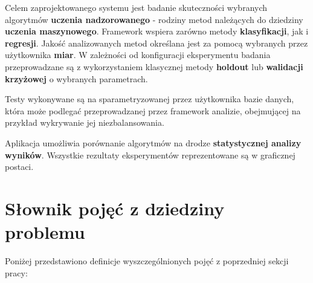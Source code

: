 \documentclass[12pt]{article}
\begin{document}
Celem zaprojektowanego systemu jest badanie skuteczności wybranych algorytmów \textbf{uczenia nadzorowanego} - rodziny metod należących do dziedziny \textbf{uczenia maszynowego}.
Framework wspiera zarówno metody \textbf{klasyfikacji}, jak i \textbf{regresji}. Jakość analizowanych metod określana jest za pomocą wybranych przez użytkownika \textbf{miar}. W zależności od konfiguracji eksperymentu badania przeprowadzane są z wykorzystaniem klasycznej metody \textbf{holdout} lub \textbf{walidacji krzyżowej} o wybranych parametrach.

Testy wykonywane są na sparametryzowanej przez użytkownika bazie danych, która może podlegać przeprowadzanej przez framework analizie, obejmującej na przykład wykrywanie jej niezbalansowania.

Aplikacja umożliwia porównanie algorytmów na drodze \textbf{statystycznej analizy wyników}.
Wszystkie rezultaty eksperymentów reprezentowane są w graficznej postaci.


\section{Słownik pojęć z dziedziny problemu}

Poniżej przedstawiono definicje wyszczególnionych pojęć z poprzedniej sekcji pracy:
\end{document}
